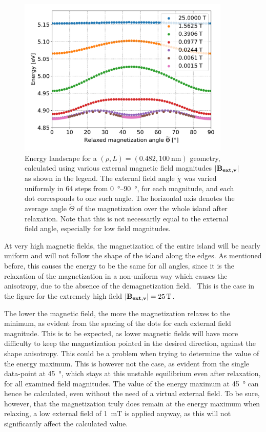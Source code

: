 \documentclass[11pt,a4paper,english]{article}
\begin{document}
\begin{figure}
    \centering
    \includegraphics[width=0.9\textwidth]{Figures/biaxial_island/BarrierLandscape/Plus_48.2_B25-0.001-div4_a128Pi_plotOptimized.pdf}
    \caption{Energy landscape for a $(\rho, L)=(0.482, \SI{100}{\nano\metre})$ geometry, calculated using various external magnetic field magnitudes $\abs{\vb{B_{ext,v}}}$ as shown in the legend. The external field angle $\widetilde{\chi}$ was varied uniformly in 64 steps from \SIrange{0}{90}{\degree}, for each magnitude, and each dot corresponds to one such angle. The horizontal axis denotes the average angle $\widetilde{\Theta}$ of the magnetization over the whole island after relaxation. Note that this is not necessarily equal to the external field angle, especially for low field magnitudes.}
    \label{fig:barrierLandscape-sweepBext_r0.482}
\end{figure}
At very high magnetic fields, the magnetization of the entire island will be nearly uniform and will not follow the shape of the island along the edges. As mentioned before, this causes the energy to be the same for all angles, since it is the relaxation of the magnetization in a non-uniform way which causes the anisotropy, due to the absence of the demagnetization field.~\cite{Nonmonotonic_reversal} This is the case in the figure for the extremely high field $\abs{\vb{B_{ext,v}}}=\SI{25}{\tesla}$. \par
The lower the magnetic field, the more the magnetization relaxes to the minimum, as evident from the spacing of the dots for each external field magnitude. This is to be expected, as lower magnetic fields will have more difficulty to keep the magnetization pointed in the desired direction, against the shape anisotropy. This could be a problem when trying to determine the value of the energy maximum. This is however not the case, as evident from the single data-point at \SI{45}{\degree}, which stays at this unstable equilibrium even after relaxation, for all examined field magnitudes. The value of the energy maximum at \SI{45}{\degree} can hence be calculated, even without the need of a virtual external field. To be sure, however, that the magnetization truly does remain at the energy maximum when relaxing, a low external field of \SI{1}{\milli\tesla} is applied anyway, as this will not significantly affect the calculated value. \par
\end{document}
